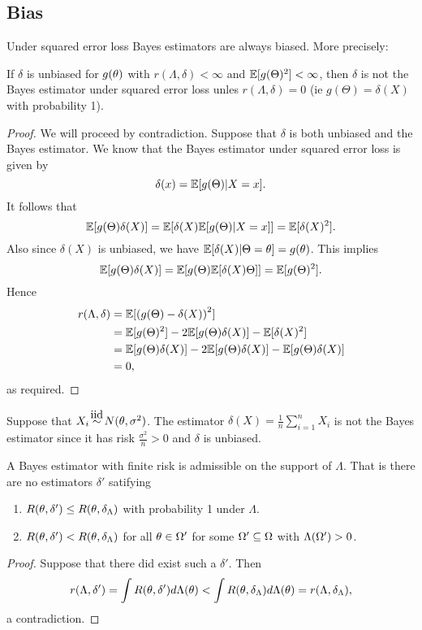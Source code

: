\subsection{Bias}
Under squared error loss Bayes estimators are always biased. More precisely:
\begin{thrm}
    If $\delta$ is unbiased for $g({\theta})$ with $r(\Lambda, \delta) < \infty$ and ${\mathbb{E}}[g(\Theta)^2]<\infty$, then $\delta$ is not the Bayes estimator under squared error loss unles $r(\Lambda, \delta) = 0$ (ie $g(\Theta) = \delta(X)$ with probability 1).
\end{thrm}
\begin{proof}
    We will proceed by contradiction. Suppose that $\delta$ is both unbiased and the Bayes estimator. We know that the Bayes estimator under squared error loss is given by 
    \[\delta(x) = {\mathbb{E}}[g(\Theta)|X=x].\]
    It follows that
    \[{\mathbb{E}}[g(\Theta)\delta(X)] = {\mathbb{E}}[\delta(X){\mathbb{E}}[g(\Theta)|X=x]] ={\mathbb{E}}[\delta(X)^2]. \]
    Also since $\delta(X)$ is unbiased, we have ${\mathbb{E}}[\delta(X)|\Theta = {\theta}] = g({\theta})$. This implies
    \[{\mathbb{E}}[g(\Theta)\delta(X)] = {\mathbb{E}}[g(\Theta){\mathbb{E}}[\delta(X)\Theta]] ={\mathbb{E}}[g(\Theta)^2].\]
    Hence
    \begin{align*}
        r(\Lambda, \delta) &= {\mathbb{E}}[\left(g(\Theta)-\delta(X)\right)^2]\\
        &={\mathbb{E}}[g(\Theta)^2]-2{\mathbb{E}}[g(\Theta)\delta(X)]-{\mathbb{E}}[\delta(X)^2]\\
        &={\mathbb{E}}[g(\Theta)\delta(X)]-2{\mathbb{E}}[g(\Theta)\delta(X)]-{\mathbb{E}}[g(\Theta)\delta(X)]\\
        &=0,
    \end{align*}
    as required.
\end{proof}
Suppose that $X_i \iid N(\ta,\sigma^2)$. The estimator $\delta(X) = \frac{1}{n}\sum_{i=1}^n X_i$ is not the Bayes estimator since it has risk $\frac{\sigma^2}{n} >0$ and $\delta$ is unbiased.
\begin{thrm}
A Bayes estimator with finite risk is admissible on the support of $\Lambda$. That is there are no estimators $\delta'$ satifying
\begin{enumerate}
    \item $R({\theta}, \delta') \le R({\theta}, \delta_\Lambda)$ with probability 1 under $\Lambda$.
    \item $R({\theta},\delta') < R({\theta},\delta_\Lambda)$ for all ${\theta} \in {{\Omega}}'$ for some ${{\Omega}}' \subseteq {{\Omega}}$ with $\Lambda({{\Omega}}') > 0$. 
\end{enumerate}
\begin{proof}
    Suppose that there did exist such a $\delta'$. Then
    \[r(\Lambda, \delta') = \int R({\theta},\delta')d\Lambda({\theta}) < \int R({\theta}, \delta_\Lambda)d\Lambda({\theta}) =r(\Lambda, \delta_\Lambda),\]
    a contradiction.
\end{proof}
\end{thrm}
